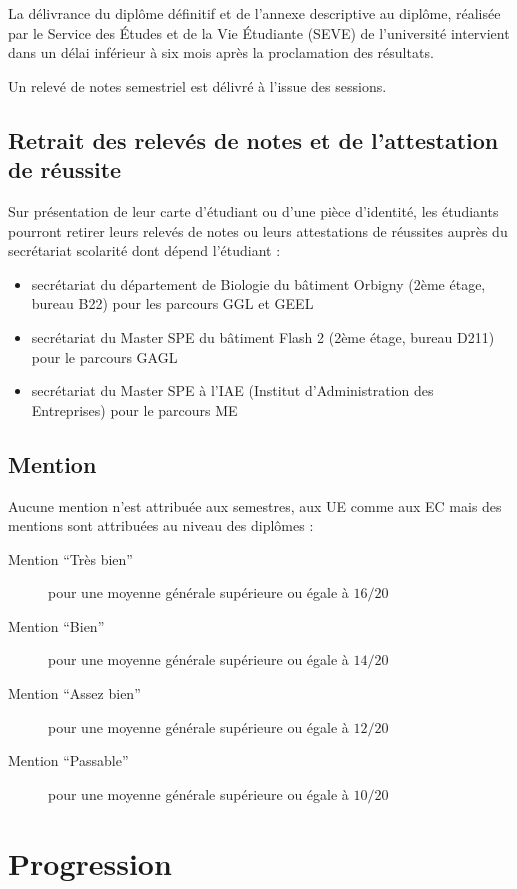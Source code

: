 \documentclass[a4paper,11pt]{article}
\begin{document}
La délivrance du diplôme définitif et de l'annexe descriptive au diplôme, réalisée par le Service des Études et de la Vie Étudiante (SEVE) de l'université intervient dans un délai inférieur à six mois après la proclamation des résultats.

Un relevé de notes semestriel est délivré à l'issue des sessions.



\subsection{Retrait des relevés de notes et de l'attestation de réussite}
Sur présentation de leur carte d'étudiant ou d'une pièce d'identité, les étudiants pourront retirer leurs relevés de notes ou leurs attestations de réussites auprès du secrétariat scolarité dont dépend l'étudiant : 
\begin{itemize}
\item secrétariat du département de Biologie du bâtiment Orbigny (2ème étage, bureau B22) pour les parcours GGL et GEEL
\item secrétariat du Master SPE du bâtiment Flash 2 (2ème étage, bureau D211) pour le parcours GAGL
\item secrétariat du Master SPE à l'IAE (Institut d'Administration des Entreprises) pour le parcours ME
\end{itemize}



\subsection{Mention}
Aucune mention n'est attribuée aux semestres, aux UE comme aux EC mais des mentions sont attribuées au niveau des diplômes :
\begin{description}
	\item[Mention ``Très bien'']	 pour une moyenne générale supérieure ou égale à $16/20$
\item[Mention ``Bien''] pour une moyenne générale supérieure ou égale à $14/20$
\item[Mention ``Assez bien''] pour une moyenne générale supérieure ou égale à $12/20$
\item[Mention ``Passable''] pour une moyenne générale supérieure ou égale à $10/20$
\end{description}




\section{Progression}\label{Progression}
\end{document}
